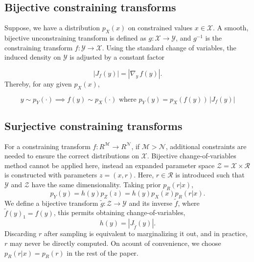 \documentclass[11pt]{article}
\newcommand{\abs}[1]{\left| #1 \right|}
\newcommand{\absdet}[1]{\abs{#1}}
\begin{document}
\subsection{Bijective constraining transforms}

 Suppose, we have a distribution $p_X(x)$ on constrained values $x \in \mathcal{X}$. A smooth, bijective unconstraining transform is defined as $g : \mathcal{X} \rightarrow \mathcal{Y}$, and $g^{-1}$ is the constraining transform $f : \mathcal{Y} \rightarrow \mathcal{X}$.  Using the standard change of variables, the induced density on $\mathcal{Y}$ is adjusted by a constant factor 
 
 \[\absdet{J_f(y)} = \absdet{\nabla_y \, f(y)}.
 \]
Thereby, for any given $p_X(x)$, 
 
 \[
 y \sim p_Y(\cdot) \implies f(y) \sim p_X(\cdot) \, \, \text{where} \, \, p_Y(y) = p_X(f(y)) \, \absdet{J_f(y)}
\]


\subsection{Surjective constraining transforms}


For a constraining transform $f: R^\mathcal{M} \rightarrow R^\mathcal{N}$, if $\mathcal{M} >  \mathcal{N}$, additional constraints are needed to ensure the correct distributions on $\mathcal{X}$. Bijective change-of-variables method cannot be applied here, instead an expanded parameter space $\mathcal{Z} = \mathcal{X} \times \mathcal{R}$ is constructed with parameters $z = (x, r)$. Here, $r \in \mathcal{R}$ is introduced such that $\mathcal{Y}$ and $\mathcal{Z}$ have the same dimensionality. Taking prior $p_R(r | x)$,
\[
p_Y(y) = h(y) p_Z(z) = h(y) p_X(x) p_R(r | x).
\]
We define a bijective transform $\tilde{g}: \mathcal{Z} \to \mathcal{Y}$ and its inverse $\tilde{f}$, where $\tilde{f}(y)_1 = f(y)$, this permits obtaining change-of-variables,
\[
h(y) = |J_{\tilde{f}}(y)|.
\]
Discarding $r$ after sampling is equivalent to marginalizing it out, and in practice, $r$ may never be directly computed. On acount of convenience,  we choose $p_R(r | x) = p_R(r)$ in the rest of the paper.

\end{document}
